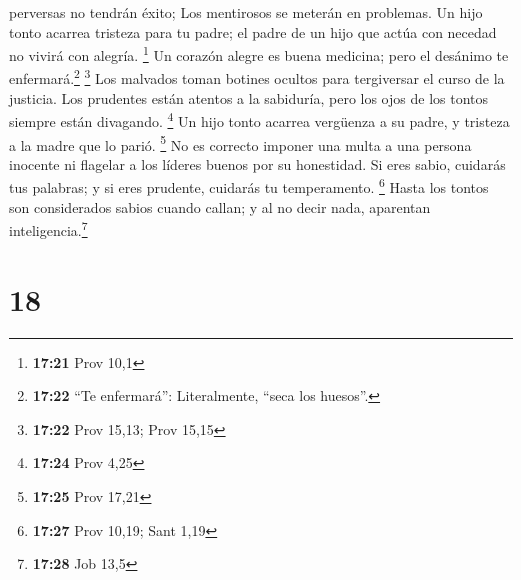 perversas no tendrán éxito; Los mentirosos se meterán en problemas.
 Un hijo tonto acarrea tristeza para tu padre; el padre
de un hijo que actúa con necedad no vivirá con alegría. \footnote{\textbf{17:21}
  Prov 10,1}  Un corazón alegre es buena medicina; pero
el desánimo te enfermará.\footnote{\textbf{17:22} ``Te enfermará'':
  Literalmente, ``seca los huesos''.} \footnote{\textbf{17:22} Prov
  15,13; Prov 15,15}  Los malvados toman botines ocultos
para tergiversar el curso de la justicia.  Los prudentes
están atentos a la sabiduría, pero los ojos de los tontos siempre están
divagando. \footnote{\textbf{17:24} Prov 4,25}  Un hijo
tonto acarrea vergüenza a su padre, y tristeza a la madre que lo parió.
\footnote{\textbf{17:25} Prov 17,21}  No es correcto
imponer una multa a una persona inocente ni flagelar a los líderes
buenos por su honestidad.  Si eres sabio, cuidarás tus
palabras; y si eres prudente, cuidarás tu temperamento. \footnote{\textbf{17:27}
  Prov 10,19; Sant 1,19}  Hasta los tontos son
considerados sabios cuando callan; y al no decir nada, aparentan
inteligencia.\footnote{\textbf{17:28} Job 13,5}

\hypertarget{section-17}{%
\section{18}\label{section-17}}

